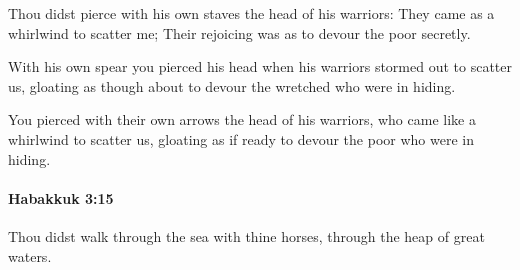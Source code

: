 			\begin{versebox}
					\item[BHS] 
					\item[LXX] 
					\item[ASV] Thou didst pierce with his own staves the head of his warriors: They came as a whirlwind to scatter me; Their rejoicing was as to devour the poor secretly.
					\item[NIV] With his own spear you pierced his head when his warriors stormed out to scatter us, gloating as though about to devour the wretched who were in hiding.
					\item[NRSV] You pierced with their own arrows the head of his warriors, who came like a whirlwind to scatter us, gloating as if ready to devour the poor who were in hiding.
			\end{versebox}

		\paragraph{Habakkuk 3:15} %
			\label{HABAKKUK-3-15}

			Thou didst walk through the sea with thine horses, through the heap of great waters.

